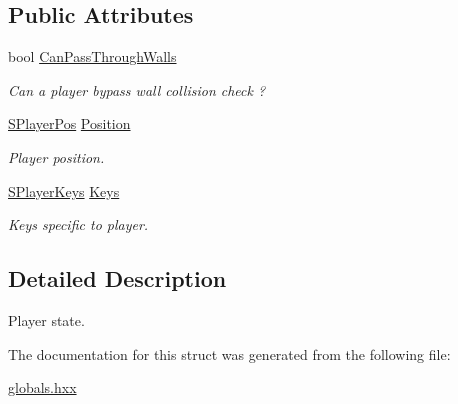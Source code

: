 \subsection*{Public Attributes}
\begin{DoxyCompactItemize}
\item 
\hypertarget{struct_chase_game_1_1_s_player_state_acd7030969c414605901e551171078bb1}{bool \hyperlink{struct_chase_game_1_1_s_player_state_acd7030969c414605901e551171078bb1}{Can\-Pass\-Through\-Walls}}\label{struct_chase_game_1_1_s_player_state_acd7030969c414605901e551171078bb1}

\begin{DoxyCompactList}\small\item\em Can a player bypass wall collision check ? \end{DoxyCompactList}\item 
\hypertarget{struct_chase_game_1_1_s_player_state_a0a68b95a4255f2a543675f88b00847b4}{\hyperlink{struct_chase_game_1_1_s_player_pos}{S\-Player\-Pos} \hyperlink{struct_chase_game_1_1_s_player_state_a0a68b95a4255f2a543675f88b00847b4}{Position}}\label{struct_chase_game_1_1_s_player_state_a0a68b95a4255f2a543675f88b00847b4}

\begin{DoxyCompactList}\small\item\em Player position. \end{DoxyCompactList}\item 
\hypertarget{struct_chase_game_1_1_s_player_state_a3fc9ce0322ed28ff9c401983d91c69f2}{\hyperlink{struct_chase_game_1_1_s_player_keys}{S\-Player\-Keys} \hyperlink{struct_chase_game_1_1_s_player_state_a3fc9ce0322ed28ff9c401983d91c69f2}{Keys}}\label{struct_chase_game_1_1_s_player_state_a3fc9ce0322ed28ff9c401983d91c69f2}

\begin{DoxyCompactList}\small\item\em Keys specific to player. \end{DoxyCompactList}\end{DoxyCompactItemize}


\subsection{Detailed Description}
Player state. 

The documentation for this struct was generated from the following file\-:\begin{DoxyCompactItemize}
\item 
\hyperlink{globals_8hxx}{globals.\-hxx}\end{DoxyCompactItemize}
